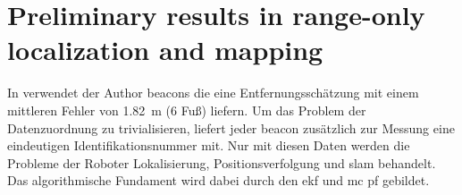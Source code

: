 %
%
\section{Preliminary results in range-only localization and mapping}

In  \cite{kantor2002preliminary} verwendet der Author \Glspl{beacon} die eine Entfernungsschätzung mit einem mittleren Fehler von \SI{1.82}{\metre} (6 Fuß) liefern. Um das Problem der Datenzuordnung zu trivialisieren, liefert jeder \Gls{beacon} zusätzlich zur Messung eine eindeutigen Identifikationsnummer mit. Nur mit diesen Daten werden die Probleme der Roboter Lokalisierung, Positionsverfolgung und \Gls{slam} behandelt. Das algorithmische Fundament wird dabei durch den \Gls{ekf} und \Gls{mc} \Gls{pf} gebildet.

